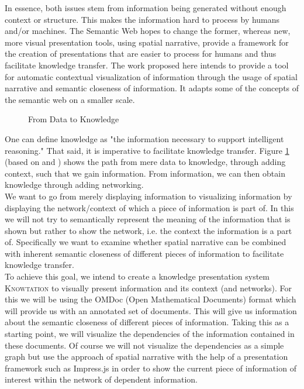 \documentclass[twoside, 12pt]{article}
\newcommand{\sys}{\textsc{Knowtation}\xspace}
\begin{document}
In essence, both issues stem from information being generated without enough context or structure. This makes the information hard to process by humans and/or machines. The Semantic Web hopes to change the former, whereas new, more visual presentation tools, using spatial narrative, provide a framework for the creation of presentations that are easier to process for humans and thus facilitate knowledge transfer. The work proposed here intends to provide a tool for automatic contextual visualization of information through the usage of spatial narrative and semantic closeness of information. It adapts some of the concepts of the semantic web on a smaller scale.\\

\begin{figure}[H]
        \centering
                \caption{From Data to Knowledge}
                \label{fig:dataknow}
\end{figure}

One can define knowledge as "the information necessary to support intelligent reasoning." \cite{Kohlhase:Complog:base} That said, it is imperative to facilitate knowledge transfer. Figure \ref{fig:dataknow} (based on \cite{ProbstRaubRomhardt} and \cite{Kohlhase:Complog:base}) shows the path from mere data to knowledge, through adding context, such that we gain information. From information, we can then obtain knowledge through adding networking.\\

We want to go from merely displaying information to visualizing information by displaying the network/context of which a piece of information is part of. In this we will not try to semantically represent the meaning of the information that is shown but rather to show the network, i.e. the context the information is a part of. Specifically we want to examine whether spatial narrative can be combined with inherent semantic closeness of different pieces of information to facilitate knowledge transfer.\\

To achieve this goal, we intend to create a knowledge presentation system \sys to visually present information and its context (and networks). For this we will be using the OMDoc (Open Mathematical Documents) format which will provide us with an annotated set of documents. This will give us information about the semantic closeness of different pieces of information. Taking this as a starting point, we will visualize the dependencies of the information contained in these documents. Of course we will not visualize the dependencies as a simple graph but use the approach of spatial narrative with the help of a presentation framework such as Impress.js in order to show the current piece of information of interest within the network of dependent information.\\
\end{document}
